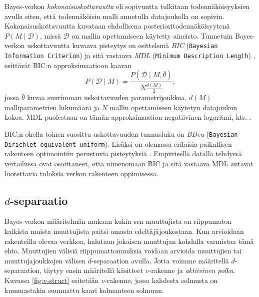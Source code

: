 Bayes-verkon \emph{kokonaisuskottavuutta} eli sopivuutta \citep{myllymaki_bayes-verkkojen_1998} tulkitaan todennäköisyyksien avulla siten, että todennäköisin malli annetulla datajoukolla on sopivin. Kokonaisuskottavuutta kuvataan ehdollisena posterioritodennäköisyytenä $P(M \mid \mathcal{D})$, missä $\mathcal{D}$ on mallin opettamiseen käytetty aineisto. Tunnetuin Bayes-verkon uskottavuutta kuvaava pisteytys on \citet{schwarz_estimating_1978} esittelemä \emph{BIC} (\texttt{Bayesian Information Criterion}) ja sitä vastaava \emph{MDL} (\texttt{Minimum Description Length}) \citep{ruggeri_bayesian_2008, liu_empirical_2012}. \citet{myllymaki_bayes-verkkojen_1998} esittävät BIC:n approksimaatioon kaavan 
$$ 
P(\mathcal{D} \mid M) = \frac{P(\mathcal{D}\mid M, \bar{\theta})}{N{\frac{d(M)}{2}}}, 
$$ 
jossa $\bar{\theta}$ kuvaa suurimman uskottavuuden parametrijoukkoa, $d(M)$ malliparametrien lukumäärä ja $N$ mallin opettamiseen käytetyn datajoukon kokoa. MDL puolestaan on tämän approksimaation negatiivinen logaritmi, kts. \citet{rissanen_stochastic_1987}. 

BIC:n ohella toinen suosittu uskottavuuden tunnusluku on \emph{BDeu} (\texttt{Bayesian Dirichlet equivalent uniform}). Lisäksi on olemassa erilaisia paikallisen rakenteen optimointiin perustuvia pisteytyksiä \citep{scanagatta_survey_2019}.   Empiirisellä datalla tehdyssä vertailussa \citet{liu_empirical_2012} ovat osoittaneet, että nimenomaan BIC ja sitä vastaava MDL antavat luotettavia tuloksia verkon rakenteen oppimisessa. 

\subsection{$d$-separaatio}\label{dsep} 

Bayes-verkon määritelmän mukaan kukin sen muuttujista on riippumaton kaikista muista muuttujista paitsi omasta edeltäjäjoukostaan. Kun arvioidaan rakenteilla olevaa verkkoa, halutaan jokaisen muuttujan kohdalla varmistaa tämä ehto. Muuttujien välisiä riippumattomuuksia voidaan arvioida muuttujien tai muuttujajoukkojen välisen $d$-separaation \citep{koller_probabilistic_2009} avulla. Jotta voimme määritellä $d$-separaation, täytyy ensin määritellä käsitteet $v$-rakenne ja \emph{aktiivinen polku}. Kuvassa \ref{fig:v-struct} esitetään $v$-rakenne, jossa kahdesta solmusta on kummastakin suunnattu kaari kolmanteen solmuun. 

\begin{center} 
\end{center} 

